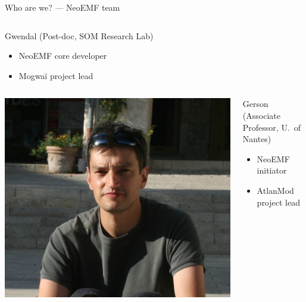 \documentclass[10pt]{beamer}
\begin{document}
\begin{frame}{Who are we? --- NeoEMF team}

\begin{columns}
\centering
\centering
\begin{block}{Gwendal (Post-doc, SOM Research Lab)}
\begin{itemize}
\item NeoEMF core developer
\item Mogwaï project lead
\end{itemize}
\end{block}
\end{columns}

\begin{columns}
\centering
\includegraphics[height=.25\textheight,clip,trim={0 3cm 0 0}]{biopic-04-gerson}
\begin{block}{Gerson (Associate Professor, U.\ of Nantes)}
\begin{itemize}
\item NeoEMF initiator
\item AtlanMod project lead
\end{itemize}
\end{block}
\end{columns}

\end{frame}
\end{document}

